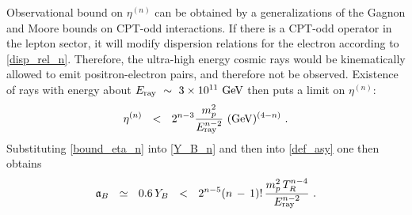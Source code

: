 \documentclass[12pt]{revtex4}
\newcommand{\Eray}{E_{\rm ray}}
\newcommand{\GeV}{{\rm GeV}}
\begin{document}
	Observational bound on $ \eta^{(n)} $ can be obtained by a generalizations
	of the Gagnon and Moore bounds 
\cite{Gagnon:2004xh} 
	on CPT-odd interactions.
	If there is a CPT-odd operator in the lepton sector, it will modify dispersion
	relations for the electron according to \eqref{disp_rel_n}.
	Therefore, the ultra-high energy cosmic rays would be kinematically allowed to 
	emit positron-electron pairs, and therefore not be observed.
	Existence of rays with energy about $ \Eray ~\sim~ 3\times10^{11}~\GeV $ then 
	puts a limit on $ \eta^{(n)} $:
\begin{equation}
\label{bound_eta_n}
	\eta^{(n)} ~~<~~ 
	2^{n-3} \frac{m_p^2}{\Eray^{n-2}}~(\GeV)^{(4-n)}~.
\end{equation}
%
	Substituting \eqref{bound_eta_n} into \eqref{Y_B_n} and then into 
	\eqref{def_asy} one then obtains
\begin{align}
\notag
	\mathfrak{a}_B ~~\simeq~~ 0.6 \, Y_B
	~~<~~ 
		2^{n-5} (n\,-\,1)!\, \frac{m_p^2\, T_R^{n-4}}{\Eray^{n-2}}~.
\end{align}
\end{document}
